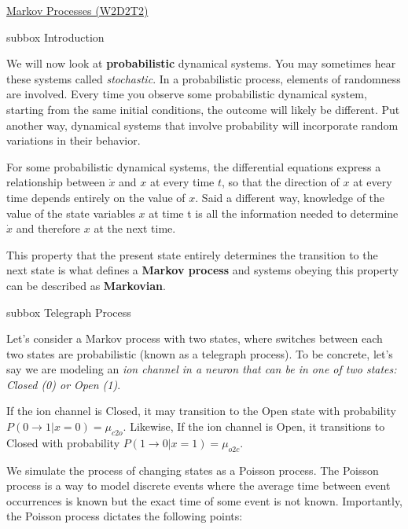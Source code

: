 \begin{textbox}{\href{https://colab.research.google.com/github/NeuromatchAcademy/course-content/blob/master/tutorials/W2D2_LinearSystems/student/W2D2_Tutorial2.ipynb}{Markov Processes (W2D2T2)}   }
\begin{subbox}{subbox}{  Introduction }

\scriptsize

We will now look at \textbf{probabilistic} dynamical systems. You may sometimes hear these systems called \textit{stochastic}. In a probabilistic process, elements of randomness are involved. Every time you observe some probabilistic dynamical system, starting from the same initial conditions, the outcome will likely be different. Put another way, dynamical systems that involve probability will incorporate random variations in their behavior. 

For some probabilistic dynamical systems, the differential equations express a relationship between $\dot{x}$ and $x$ at every time $t$, so that the direction of $x$ at every time depends entirely on the value of $x$. Said a different way, knowledge of the value of the state variables $x$ at time t is all the information needed to determine $\dot{x}$ and therefore $x$ at the next time.

This property that the present state entirely determines the transition to the next state  is what defines a \textbf{Markov process} and systems obeying this property can be described as \textbf{Markovian}.


\end{subbox}
\begin{subbox}{subbox}{ Telegraph Process}

\scriptsize

Let's consider a Markov process with two states, where switches between each two states are probabilistic (known as a telegraph process). To be concrete, let's say we are modeling an \textit{ion channel in a neuron that can be in one of two states: Closed (0) or Open (1)}. 

If the ion channel is Closed, it may transition to the Open state with probability $P(0 \rightarrow 1 | x = 0) = \mu_{c2o}$. Likewise, If the ion channel is Open, it transitions to Closed with probability $P(1 \rightarrow 0 | x=1) = \mu_{o2c}$.

We simulate the process of changing states as a Poisson process. The Poisson process is a way to model discrete events where the average time between event occurrences is known but the exact time of some event is not known. Importantly, the Poisson process dictates the following points: 


\end{subbox}
\end{textbox}
